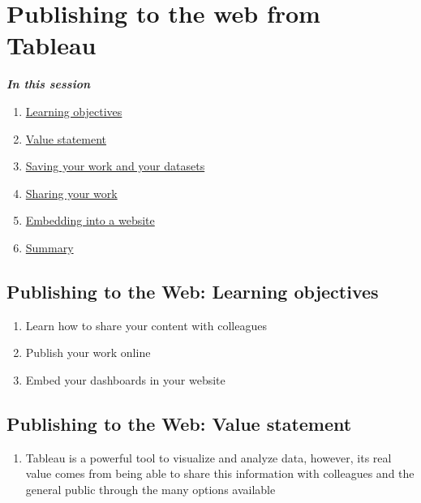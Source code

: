 \documentclass[
]{book}
\providecommand{\tightlist}{%
  \setlength{\itemsep}{0pt}\setlength{\parskip}{0pt}}
\begin{document}
\hypertarget{publishing-to-the-web-from-tableau}{%
\section{Publishing to the web from Tableau}\label{publishing-to-the-web-from-tableau}}

\textbf{\emph{In this session }}

\begin{enumerate}
\def\labelenumi{\arabic{enumi}.}
\tightlist
\item
  \protect\hyperlink{Publishing-to-the-Web-learning-objectives}{Learning objectives}
\item
  \protect\hyperlink{Publishing-to-the-Web-value-statement}{Value statement}
\item
  \protect\hyperlink{saving-your-work-and-your-datasets}{Saving your work and your datasets}
\item
  \protect\hyperlink{sharing-your-work}{Sharing your work}
\item
  \protect\hyperlink{embedding-into-a-website}{Embedding into a website}
\item
  \protect\hyperlink{summary}{Summary}
\end{enumerate}

\hypertarget{publishing-to-the-web-learning-objectives}{%
\subsection{Publishing to the Web: Learning objectives}\label{publishing-to-the-web-learning-objectives}}

\begin{enumerate}
\def\labelenumi{\arabic{enumi}.}
\tightlist
\item
  Learn how to share your content with colleagues
\item
  Publish your work online
\item
  Embed your dashboards in your website
\end{enumerate}

\hypertarget{publishing-to-the-web-value-statement}{%
\subsection{Publishing to the Web: Value statement}\label{publishing-to-the-web-value-statement}}

\begin{enumerate}
\def\labelenumi{\arabic{enumi}.}
\tightlist
\item
  Tableau is a powerful tool to visualize and analyze data, however, its real value comes from being able to share this information with colleagues and the general public through the many options available
\end{enumerate}
\end{document}

